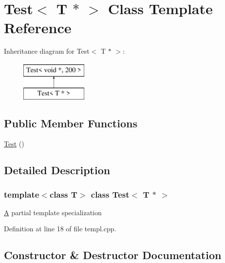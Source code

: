 \hypertarget{class_test_3_01_t_01_5_01_4}{}\section{Test$<$ T $\ast$ $>$ Class Template Reference}
\label{class_test_3_01_t_01_5_01_4}
Inheritance diagram for Test$<$ T $\ast$ $>$\+:\begin{figure}[H]
\begin{center}
\leavevmode
\includegraphics[height=2.000000cm]{class_test_3_01_t_01_5_01_4}
\end{center}
\end{figure}
\subsection*{Public Member Functions}
\begin{DoxyCompactItemize}
\item 
\hyperlink{class_test_3_01_t_01_5_01_4_a350e5417b9f48c2f7b98937514b03da2}{Test} ()
\end{DoxyCompactItemize}


\subsection{Detailed Description}
\subsubsection*{template$<$class T$>$\newline
class Test$<$ T $\ast$ $>$}

\hyperlink{class_a}{A} partial template specialization 

Definition at line 18 of file templ.\+cpp.



\subsection{Constructor \& Destructor Documentation}
\mbox{\label{class_test_3_01_t_01_5_01_4_a350e5417b9f48c2f7b98937514b03da2}} 
